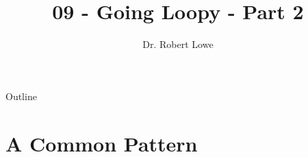 \documentclass[]{beamer}
\title{09 - Going Loopy - Part 2}
\author{Dr. Robert Lowe\\}
\institute[Maryville College] %
{
  Division of Mathematics and Computer Science\\
  Maryville College
}
\date[]{}
\begin{document}
\begin{frame}
  \titlepage
\end{frame}

\begin{frame}{Outline}
  \tableofcontents
\end{frame}





\section{A Common Pattern}
\end{document}

